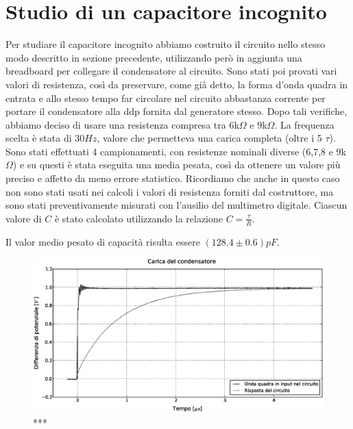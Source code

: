 \section{Studio di un capacitore incognito}
Per studiare il capacitore incognito abbiamo costruito il circuito nello stesso modo descritto in sezione precedente, utilizzando però in aggiunta una breadboard per collegare il condensatore al circuito. Sono stati poi provati vari valori di resistenza, così da preservare, come già detto, la forma d'onda quadra in entrata e allo stesso tempo far circolare nel circuito abbastanza corrente per portare il condensatore alla ddp fornita dal generatore stesso. Dopo tali verifiche, abbiamo deciso di usare una resistenza compresa tra $6$k$\Omega$ e $9$k$\Omega$. La frequenza scelta è stata di $30Hz$, valore che permetteva una carica completa (oltre i 5 $\tau$). Sono stati effettuati 4 campionamenti, con resistenze nominali diverse (6,7,8 e 9k$\Omega$) e su questi è stata eseguita una media pesata, così da ottenere un valore più preciso e affetto da meno errore statistico.
Ricordiamo che anche in questo caso non sono stati usati nei calcoli i valori di resistenza forniti dal costruttore, ma sono stati preventivamente misurati con l'ausilio del multimetro digitale. Ciascun valore di $C$ è stato calcolato utilizzando la relazione $C=\frac{\tau}{R}$.

Il valor medio pesato di capacità risulta essere $(128.4\pm0.6) pF$. 

\begin{figure}[h]
    \centering
        \includegraphics[width=\textwidth]{figure3.eps}%
        \caption{***}
        \label{fig:1}
\end{figure}